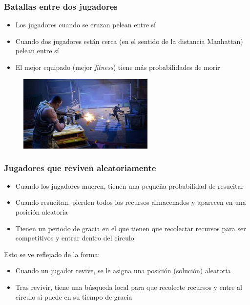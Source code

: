 \documentclass{beamer}
\begin{document}
\begin{frame}
    \frametitle{Batallas entre dos jugadores}

    \begin{itemize}
        \item Los jugadores cuando se cruzan pelean entre sí
        \item Cuando dos jugadores están cerca (en el sentido de la distancia Manhattan) pelean entre sí
        \item El mejor equipado (mejor \emph{fitness}) tiene más probabilidades de morir
    \end{itemize}

    \begin{figure}
        \centering
        \includegraphics[width=0.6\textwidth]{fight}
    \end{figure}

\end{frame}

\begin{frame}
    \frametitle{Jugadores que reviven aleatoriamente}

    \begin{itemize}
        \item Cuando los jugadores mueren, tienen una pequeña probabilidad de resucitar \footnotemark
        \item Cuando resucitan, pierden todos los recursos almacenados y aparecen en una posición aleatoria
        \item Tienen un periodo de gracia en el que tienen que recolectar recursos para ser competitivos y entrar dentro del círculo
    \end{itemize}

    Esto se ve reflejado de la forma:

    \begin{itemize}
        \item Cuando un jugador revive, se le asigna una posición (solución) aleatoria
        \item Tras revivir, tiene una búsqueda local para que recolecte recursos y entre al círculo si puede en su tiempo de gracia
    \end{itemize}

\end{frame}
\end{document}
